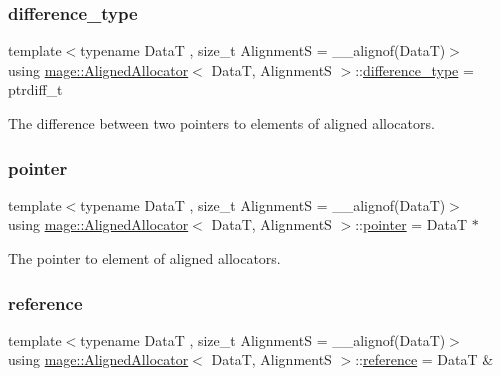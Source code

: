 \subsubsection{\texorpdfstring{difference\+\_\+type}{difference\_type}}
{\footnotesize\ttfamily template$<$typename DataT , size\+\_\+t AlignmentS = \+\_\+\+\_\+alignof(\+Data\+T)$>$ \\
using \hyperlink{structmage_1_1_aligned_allocator}{mage\+::\+Aligned\+Allocator}$<$ DataT, AlignmentS $>$\+::\hyperlink{structmage_1_1_aligned_allocator_aa66abd74c38e5e565fca600a066a5915}{difference\+\_\+type} =  ptrdiff\+\_\+t}

The difference between two pointers to elements of aligned allocators. \hypertarget{structmage_1_1_aligned_allocator_a4f6b515d4d9d27a8b9e27376302034c4}{}\label{structmage_1_1_aligned_allocator_a4f6b515d4d9d27a8b9e27376302034c4} 
\subsubsection{\texorpdfstring{pointer}{pointer}}
{\footnotesize\ttfamily template$<$typename DataT , size\+\_\+t AlignmentS = \+\_\+\+\_\+alignof(\+Data\+T)$>$ \\
using \hyperlink{structmage_1_1_aligned_allocator}{mage\+::\+Aligned\+Allocator}$<$ DataT, AlignmentS $>$\+::\hyperlink{structmage_1_1_aligned_allocator_a4f6b515d4d9d27a8b9e27376302034c4}{pointer} =  DataT $\ast$}

The pointer to element of aligned allocators. \hypertarget{structmage_1_1_aligned_allocator_a95fd7625632a0143d72ad02ca520be4d}{}\label{structmage_1_1_aligned_allocator_a95fd7625632a0143d72ad02ca520be4d} 
\subsubsection{\texorpdfstring{reference}{reference}}
{\footnotesize\ttfamily template$<$typename DataT , size\+\_\+t AlignmentS = \+\_\+\+\_\+alignof(\+Data\+T)$>$ \\
using \hyperlink{structmage_1_1_aligned_allocator}{mage\+::\+Aligned\+Allocator}$<$ DataT, AlignmentS $>$\+::\hyperlink{structmage_1_1_aligned_allocator_a95fd7625632a0143d72ad02ca520be4d}{reference} =  DataT \&}

